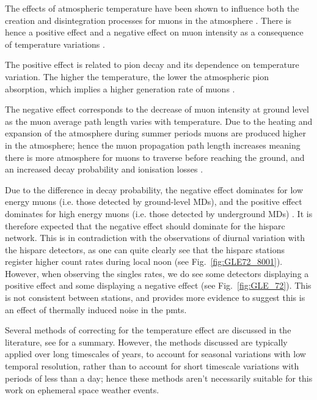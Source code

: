 The effects of atmospheric temperature have been shown to influence both the creation and disintegration processes for muons in the atmosphere \citep{berkova_temperature_2011}. There is hence a positive effect and a negative effect on muon intensity as a consequence of temperature variations \citep{mendoncca_temperature_2016}. 

The positive effect is related to pion decay and its dependence on temperature variation. The higher the temperature, the lower the atmospheric pion absorption, which implies a higher generation rate of muons \citep{mendoncca_temperature_2016}.

The negative effect corresponds to the decrease of muon intensity at ground level as the muon average path length varies with temperature. Due to the heating and expansion of the atmosphere during summer periods muons are produced higher in the atmosphere; hence the muon propagation path length increases meaning there is more atmosphere for muons to traverse before reaching the ground, and an increased decay probability and ionisation losses \citep{savic_pressure_2015, mendoncca_temperature_2016}.

Due to the difference in decay probability, the negative effect dominates for low energy muons (i.e. those detected by ground-level MDs), and the positive effect dominates for high energy muons (i.e. those detected by underground MDs) \citep{berkova_temperature_2011}. It is therefore expected that the negative effect should dominate for the \gls{hisparc} network. This is in contradiction with the observations of diurnal variation with the \gls{hisparc} detectors, as one can quite clearly see that the \gls{hisparc} stations register higher count rates during local noon (see Fig.~\ref{fig:GLE72_8001}). However, when observing the singles rates, we do see some detectors displaying a positive effect and some displaying a negative effect (see Fig.~\ref{fig:GLE_72}). This is not consistent between stations, and provides more evidence to suggest this is an effect of thermally induced noise in the \glspl{pmt}. %


Several methods of correcting for the temperature effect are discussed in the literature, see \citet{berkova_temperature_2011, mendoncca_temperature_2016} for a summary. However, the methods discussed are typically applied over long timescales of years, to account for seasonal variations with low temporal resolution, rather than to account for short timescale variations with periods of less than a day; hence these methods aren't necessarily suitable for this work on ephemeral space weather events.

